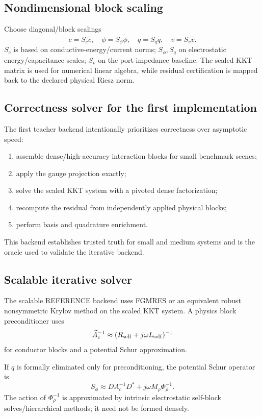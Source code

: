 \subsection{Nondimensional block scaling}

Choose diagonal/block scalings
\[
  c=S_c\widetilde c,\quad
  \phi=S_\phi\widetilde\phi,\quad
  q=S_q\widetilde q,\quad
  v=S_v\widetilde v.
\]
$S_c$ is based on conductive-energy/current norms; $S_\phi,S_q$ on electrostatic
energy/capacitance scales; $S_v$ on the port impedance baseline. The scaled KKT
matrix is used for numerical linear algebra, while residual certification is
mapped back to the declared physical Riesz norm.

\subsection{Correctness solver for the first implementation}

The first teacher backend intentionally prioritizes correctness over asymptotic
speed:
\begin{enumerate}
\item assemble dense/high-accuracy interaction blocks for small benchmark
      scenes;
\item apply the gauge projection exactly;
\item solve the scaled KKT system with a pivoted dense factorization;
\item recompute the residual from independently applied physical blocks;
\item perform basis and quadrature enrichment.
\end{enumerate}
This backend establishes trusted truth for small and medium systems and is the
oracle used to validate the iterative backend.

\subsection{Scalable iterative solver}

The scalable REFERENCE backend uses FGMRES or an equivalent robust nonsymmetric
Krylov method on the scaled KKT system. A physics block preconditioner uses
\[
  \widetilde A_c^{-1}
  \approx
  (R_{\rm self}+j\omega L_{\rm self})^{-1}
\]
for conductor blocks and a potential Schur approximation.

If $q$ is formally eliminated only for preconditioning, the potential Schur
operator is
\[
 S_\phi
 \approx
 D A_c^{-1}D^\ast
 +j\omega M_\rho\Phi_\rho^{-1}.
 \label{eq:potential-schur}
\]
The action of $\Phi_\rho^{-1}$ is approximated by intrinsic electrostatic
self-block solves/hierarchical methods; it need not be formed densely.

